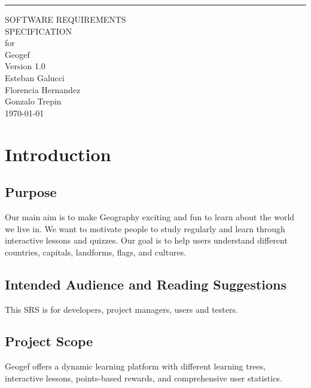 \documentclass{scrreprt}
\date{}
\def\myversion{1.0 }
\begin{document}
\begin{flushright}
    \rule{16cm}{5pt}\vskip1cm
    \begin{bfseries}
        \Huge{SOFTWARE REQUIREMENTS\\ SPECIFICATION}\\
        \vspace{1.5cm}
        for\\
        \vspace{1.5cm}
        Geogef\\
        \vspace{1.5cm}
        \LARGE{Version \myversion}\\
        \vspace{1.5cm}
        Esteban Galucci \\
        Florencia Hernandez \\
        Gonzalo Trepin \\
        \today\\
    \end{bfseries}
\end{flushright}

\tableofcontents

\chapter{Introduction}

\section{Purpose}

Our main aim is to make Geography exciting and fun to learn about the world we live in. We want to motivate people to study regularly and learn through interactive lessons and quizzes. Our goal is to help users understand different countries, capitals, landforms, flags, and cultures.

\section{Intended Audience and Reading Suggestions}
This SRS is for developers, project managers, users and testers. 

\section{Project Scope}
Geogef offers a dynamic learning platform with different learning trees, interactive lessons, points-based rewards, and comprehensive user statistics.
\end{document}
